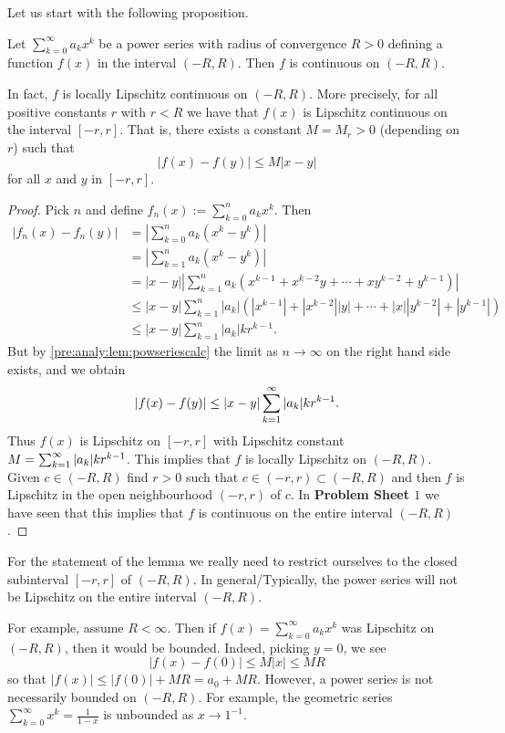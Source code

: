 \documentclass[10pt, a4paper]{article}
\newcommand{\infsumo}[1][k = 0]{\sum_{#1}^{\infty}}
\begin{document}
Let us start with the following proposition.
\begin{proposition}
    Let $\infsumo a_kx ^ k$ be a power series with radius of convergence $R > 0$ defining a function $f(x)$ in the interval $(-R, R)$.
    Then $f$ is continuous on $(-R, R)$.

    In fact,
    $f$ is locally Lipschitz continuous on $(-R, R)$.
    More precisely,
    for all positive constants $r$ with $r < R$ we have that $f(x)$ is Lipschitz continuous on the interval $[-r, r]$.
    That is,
    there exists a constant $M = M_r > 0$
    (depending on $r$)
    such that
    \[
    |f(x) - f(y)| \leq M|x - y|
    \]
    for all $x$ and $y$ in $[-r, r]$.
    \begin{proof}
        Pick $n$ and define $f_n(x) := \sum_{k = 0}^{n}a_kx ^ k$.
        Then
        \begin{align*}
            |f_n(x) - f_n(y)| &= \left|\sum_{k = 0}^{n}a_k(x ^ k - y ^ k)\right| \\
            &= \left|\sum_{k = 1}^{n}a_k(x ^ k - y ^ k)\right| \\
            &= |x - y|\left|\sum_{k = 1}^{n}a_k\left(x ^ {k - 1} + x ^ {k - 2}y + \dotsi + xy ^ {k - 2} + y ^ {k - 1}\right)\right| \\
            &\leq |x - y|\sum_{k = 1}^{n}|a_k|\left(|x ^ {k - 1}| + |x ^ {k - 2}||y| + \dotsi + |x||y ^ {k - 2}| + |y ^ {k - 1}|\right) \\
            &\leq |x - y|\sum_{k = 1}^{n}|a_k|kr ^ {k - 1}.
        \end{align*}
        But by \autoref{pre:analy:lem:powseriescalc} the limit as $n \rightarrow \infty$ on the right hand side exists,
        and we obtain
        \[
        |f(x) - f(y)| \leq |x - y|\sum_{k = 1}^{\infty}|a_k|kr ^ {k - 1}.
        \]
        Thus $f(x)$ is Lipschitz on $[-r, r]$ with Lipschitz constant $M = \sum_{k = 1}^{\infty}|a_k|kr ^ {k - 1}$.
        This implies that $f$ is locally Lipschitz on $(-R, R)$.
        Given $c \in (-R, R)$ find $r > 0$ such that $c \in (-r, r) \subset (-R, R)$ and then $f$ is Lipschitz in the open neighbourhood $(-r, r)$ of $c$.
        In \textbf{Problem Sheet $1$} we have seen that this implies that $f$ is continuous on the entire interval $(-R, R)$.
    \end{proof}
\end{proposition}

\begin{remark}
    For the statement of the lemma we really need to restrict ourselves to the closed subinterval $[-r, r]$ of $(-R, R)$.
    In general/Typically,
    the power series will not be Lipschitz on the entire interval $(-R, R)$.
    
    For example,
    assume $R < \infty$.
    Then if $f(x) = \infsumo a_kx ^ k$ was Lipschitz on $(-R, R)$,
    then it would be bounded.
    Indeed,
    picking $y = 0$,
    we see
    \[
    |f(x) - f(0)| \leq M|x| \leq MR
    \]
    so that $|f(x)| \leq |f(0)| + MR = a_0 + MR$.
    However,
    a power series is not necessarily bounded on $(-R, R)$.
    For example,
    the geometric series $\infsumo x ^ k = \frac{1}{1 - x}$ is unbounded as $x \rightarrow 1 ^ {-1}$.
\end{remark}
\end{document}
